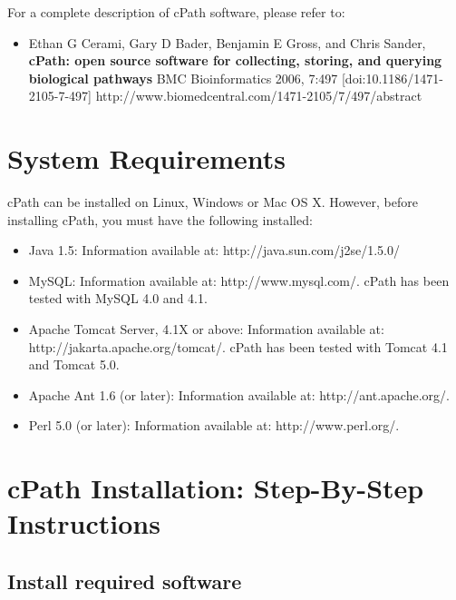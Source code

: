 \documentclass{article}
\begin{document}
\bigskip

For a complete description of cPath software, please refer to:

\begin{itemize}
\item Ethan G Cerami, Gary D Bader, Benjamin E Gross, and Chris Sander, \textbf{cPath: open source software for collecting, storing, and querying biological pathways} BMC Bioinformatics 2006, 7:497 [doi:10.1186/1471-2105-7-497]
http://www.biomedcentral.com/1471-2105/7/497/abstract
\end{itemize}

\section{System Requirements}

cPath can be installed on Linux, Windows or Mac OS X.  However, before installing cPath, you must have the following installed: 

\begin{itemize}

\item Java 1.5:  Information available at:  http://java.sun.com/j2se/1.5.0/

\item MySQL: Information available at: http://www.mysql.com/.  cPath has been 
tested with MySQL 4.0 and 4.1. 

\item Apache Tomcat Server, 4.1X or above: Information available at: 
http://jakarta.apache.org/tomcat/.  cPath has been tested with Tomcat 4.1 
and Tomcat 5.0. 
 
\item Apache Ant 1.6 (or later): Information available at: http://ant.apache.org/. 
 
\item Perl 5.0 (or later): Information available at: http://www.perl.org/. 


\end {itemize}

\section{cPath Installation:  Step-By-Step Instructions }

\subsection{Install required software}
\end{document}
